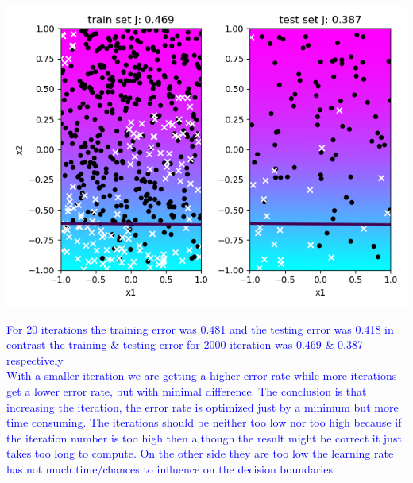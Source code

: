 \documentclass[a4paper]{article}
\begin{document}
\begin{enumerate}
\begin{minipage}[b]{0.4\textwidth}
\end{minipage}
\hfill
\begin{minipage}[b]{0.4\textwidth}
              \includegraphics[scale=0.35]{plots/gradient_descent_1_1_2000.png}
				\captionsetup{justification=centering}
                \label{gradient_descent_1_1_2000}
\end{minipage}
    \textcolor{blue}{For 20 iterations the training error was 0.481 and the testing error was 0.418 in contrast the training \& testing error for 2000 iteration was 0.469 \& 0.387 respectively\\
With a smaller iteration we are getting a higher error rate while more iterations get a lower error rate, but with minimal difference.
The conclusion is that increasing the iteration, the error rate is optimized just by a minimum but more time consuming.
The iterations should be neither too low nor too high because if the iteration number is too high then although the result might be correct it just takes too long  to compute. On the other side they are too low the learning rate has not much time/chances to influence on the decision boundaries}


\end{enumerate}
\end{document}
